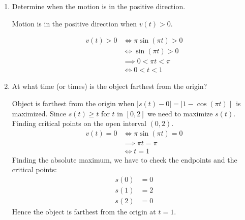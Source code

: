 \documentclass[nooutcomes,handout]{ximera}
\begin{document}
\begin{problem}
\begin{enumerate}
	\item Determine when the motion is in the positive direction.
	
	
	\begin{freeResponse}	
	Motion is in the positive direction when $v(t)>0$.
	
	\begin{align*}
	v(t)>0 & \iff \pi \sin(\pi t)>0\\
	& \iff \sin(\pi t)>0\\
	& \implies 0<\pi t <\pi\\
	& \iff 0<t<1	
	\end{align*}
	\end{freeResponse}
	

	\item At what time (or times) is the object farthest from the origin?

	\begin{freeResponse}	
	Object is farthest from the origin when $\mid{s(t)-0}\mid=\mid{1-\cos(\pi t)}\mid$ is maximized.  Since $s(t) \ge t$ for $t$ in $[0,2]$ we need to maximize $s(t)$.
	Finding critical points on the open interval $(0,2)$.
	\begin{align*}
	v(t)=0 &\iff \pi\sin(\pi t)=0\\
	&\implies \pi t=\pi\\
	&\iff t=1
	\end{align*}
	Finding the absolute maximum, we have to check the endpoints and the critical points:
	\begin{align*}
	s(0)&=0\\
	s(1)&=2\\
	s(2)&=0
	\end{align*}
	Hence the object is farthest from the origin at $t=1$.
	
	\end{freeResponse}



\end{enumerate}

\end{problem}
\end{document}
